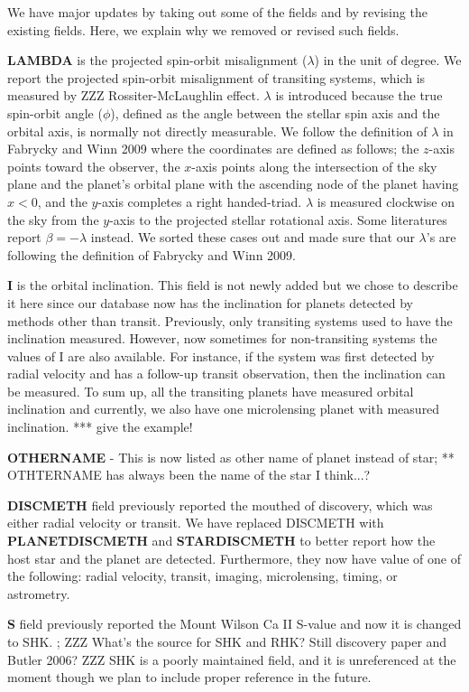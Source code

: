 \documentclass[11pt,preprint]{aastex}
\begin{document}
\begin{CJK*}{UTF8}{gbsn}
We have major updates by taking out some of the fields and by revising the existing fields. Here, we explain why we removed or revised such fields. 

{\bf LAMBDA} is the projected spin-orbit misalignment ($\lambda$) in
the unit of degree. We report the projected spin-orbit misalignment of
transiting systems, which is measured by ZZZ Rossiter-McLaughlin
effect. $\lambda$ is introduced because the true spin-orbit angle
($\phi$), defined as the angle between the stellar spin axis and the
orbital axis, is normally not directly measurable. We follow the
definition of $\lambda$ in Fabrycky and Winn 2009 where the
coordinates are defined as follows; the $z$-axis points toward the
observer, the $x$-axis points along the intersection of the sky plane
and the planet's orbital plane with the ascending node of the planet
having $x<0$, and the $y$-axis completes a right
handed-triad. $\lambda$ is measured clockwise on the sky from the
$y$-axis to the projected stellar rotational axis. Some literatures
report $\beta = -\lambda$ instead. We sorted these cases out and made
sure that our $\lambda$'s are following the definition of Fabrycky and
Winn 2009.

{\bf I} is the orbital inclination. This field is not newly added but
we chose to describe it here since our database now has the
inclination for planets detected by methods other than
transit. Previously, only transiting systems used to have the
inclination measured. However, now sometimes for non-transiting
systems the values of I are also available. For instance, if the
system was first detected by radial velocity and has a follow-up
transit observation, then the inclination can be measured. To sum up,
all the transiting planets have measured orbital inclination and
currently, we also have one microlensing planet with measured
inclination. *** give the example!


{\bf OTHERNAME} - This is now listed as other name of planet instead
of star; ** OTHTERNAME has always been the name of the star I
think...?

{\bf DISCMETH} field previously reported the mouthed of discovery,
which was either radial velocity or transit. We have replaced DISCMETH
with {\bf PLANETDISCMETH} and {\bf STARDISCMETH} to better report how
the host star and the planet are detected. Furthermore, they now have
value of one of the following: radial velocity, transit, imaging,
microlensing, timing, or astrometry.

{\bf S} field previously reported the Mount Wilson Ca II S-value and
now it is changed to SHK.  ; ZZZ What's the source for SHK and RHK?
Still discovery paper and Butler 2006? ZZZ SHK is a poorly maintained
field, and it is unreferenced at the moment though we plan to include
proper reference in the future.


\end{CJK*}
\end{document}

